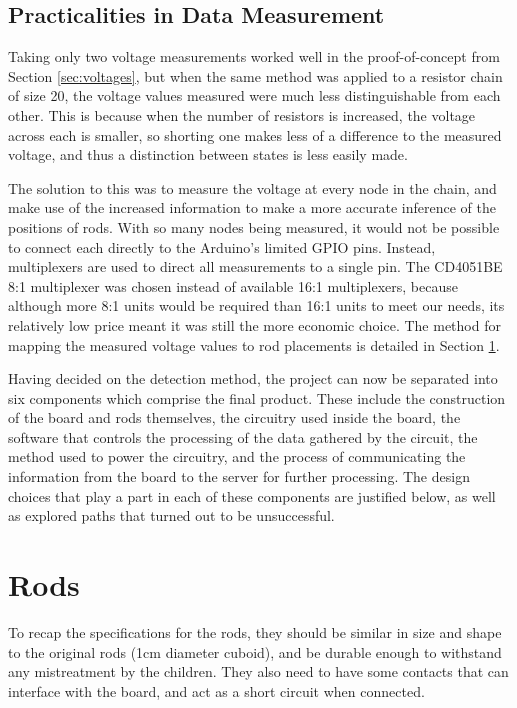 
\subsection{Practicalities in Data Measurement}

\par Taking only two voltage measurements worked well in the proof-of-concept from Section \ref{sec:voltages}, but when the same method was applied to a resistor chain of size 20, the voltage values measured were much less distinguishable from each other. This is because when the number of resistors is increased, the voltage across each is smaller, so shorting one makes less of a difference to the measured voltage, and thus a distinction between states is less easily made. 

The solution to this was to measure the voltage at every node in the chain, and make use of the increased information to make a more accurate inference of the positions of rods. With so many nodes being measured, it would not be possible to connect each directly to the Arduino's limited GPIO pins. Instead, multiplexers are used to direct all measurements to a single pin. The CD4051BE 8:1 multiplexer \cite{CD4051BE27:online} was chosen instead of available 16:1 multiplexers, because although more 8:1 units would be required than 16:1 units to meet our needs, its relatively low price meant it was still the more economic choice. The method for mapping the measured voltage values to rod placements is detailed in Section \ref{sec:rods}. 

Having decided on the detection method, the project can now be separated into six components which comprise the final product. These include the construction of the board and rods themselves, the circuitry used inside the board, the software that controls the processing of the data gathered by the circuit, the method used to power the circuitry, and the process of communicating the information from the board to the server for further processing. The design choices that play a part in each of these components are justified below, as well as explored paths that turned out to be unsuccessful. 

\section{Rods}
\label{sec:rods}
To recap the specifications for the rods, they should be similar in size and shape to the original rods (1cm diameter cuboid), and be durable enough to withstand any mistreatment by the children. They also need to have some contacts that can interface with the board, and act as a short circuit when connected. 


